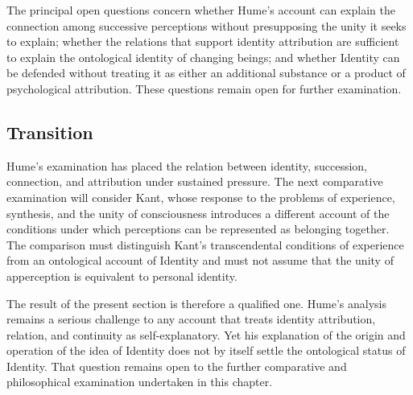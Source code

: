 \label{para:VS.B01.P01.C08.S09.SS14.P004}

The principal open questions concern whether
Hume's account can explain the connection among
successive perceptions without presupposing
the unity it seeks to explain; whether the
relations that support identity attribution
are sufficient to explain the ontological
identity of changing beings; and whether
Identity can be defended without treating it
as either an additional substance or a product
of psychological attribution. These questions
remain open for further examination.



\subsection{Transition}
\label{subsec:ch08-hume-transition}

\label{para:VS.B01.P01.C08.S09.SS15.P001}

Hume's examination has placed the relation between
identity, succession, connection, and attribution
under sustained pressure. The next comparative
examination will consider Kant, whose response
to the problems of experience, synthesis, and
the unity of consciousness introduces a different
account of the conditions under which perceptions
can be represented as belonging together. The
comparison must distinguish Kant's transcendental
conditions of experience from an ontological
account of Identity and must not assume that
the unity of apperception is equivalent to
personal identity.

\label{para:VS.B01.P01.C08.S09.SS15.P002}

The result of the present section is therefore
a qualified one. Hume's analysis remains a
serious challenge to any account that treats
identity attribution, relation, and continuity
as self-explanatory. Yet his explanation of
the origin and operation of the idea of Identity
does not by itself settle the ontological status
of Identity. That question remains open to
the further comparative and philosophical
examination undertaken in this chapter.


